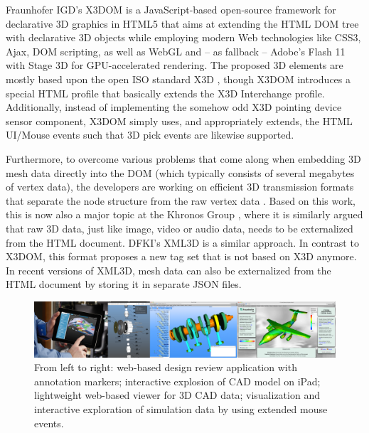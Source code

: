 \documentclass[review]{acmsiggraph}
\begin{document}
Fraunhofer IGD's X3DOM \cite{Behr2009,Behr12} is a JavaScript-based open-source framework for declarative 3D graphics in HTML5 that aims at extending the HTML DOM tree with declarative 3D objects while employing modern Web technologies like CSS3, Ajax, DOM scripting, as well as WebGL and -- as fallback -- Adobe's Flash 11 with Stage 3D for GPU-accelerated rendering. The proposed 3D elements are mostly based upon the open ISO standard X3D \cite{Web3D-X3D}, though X3DOM introduces a special HTML profile that basically extends the X3D Interchange profile. Additionally, instead of implementing the somehow odd X3D pointing device sensor component, X3DOM simply uses, and appropriately extends, the HTML UI/Mouse events such that 3D pick events are likewise supported.

Furthermore, to overcome various problems that come along when embedding 3D mesh data directly into the DOM (which typically consists of several megabytes of vertex data), the developers are working on efficient 3D transmission formats that separate the node structure from the raw vertex data \cite{Behr12}. Based on this work, this is now also a major topic at the Khronos Group \cite{Trevett12}, where it is similarly argued that raw 3D data, just like image, video or audio data, needs to be externalized from the HTML document.
DFKI's XML3D \cite{Sons2010} is a similar approach. In contrast to X3DOM, this format proposes a new tag set that is not based on X3D anymore. In recent versions of XML3D, mesh data can also be externalized from the HTML document by storing it in separate JSON files.


\begin{figure}
  \centering
  \includegraphics[width=1.0\textwidth]{images/cad_apps.png}
  \caption{From left to right: web-based design review application with annotation markers; interactive explosion of CAD model on iPad; lightweight web-based viewer for 3D CAD data; visualization and interactive exploration of simulation data by using extended mouse events.}
    \label{fig:cadApps}
\end{figure}
\end{document}
